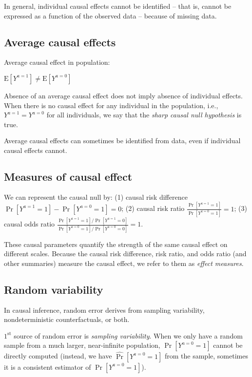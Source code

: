 \documentclass{article}
\begin{document}
In general, individual causal effects cannot be identified -- that is, cannot be expressed as a function of the observed data -- because of missing data. 

\subsection{Average causal effects}
\begin{mdframed}
Average causal effect in population:
\begin{center}
	$\mathrm{E}\left[Y^{a=1}\right] \neq \mathrm{E}\left[Y^{a=0}\right]$
\end{center}
\end{mdframed}

Absence of an average causal effect does not imply absence of individual effects. When there is no causal effect for any individual in the population, i.e., $Y^{a=1}=Y^{a=0}$ for all individuals, we say that the \textit{sharp causal null hypothesis} is true.  

Average causal effects can sometimes be identified from data, even if individual causal effects cannot.

\subsection{Measures of causal effect}
We can represent the causal null by: (1)  causal risk difference  $\operatorname{Pr}\left[Y^{a=1}=1\right]-\operatorname{Pr}\left[Y^{a=0}=1\right]=0$; (2) causal risk ratio  $\frac{\operatorname{Pr}\left[Y^{a=1}=1\right]}{\operatorname{Pr}\left[Y^{a=0}=1\right]}=1$; (3) causal odds ratio $\frac{\operatorname{Pr}\left[Y^{a=1}=1\right] / \operatorname{Pr}\left[Y^{a=1}=0\right]}{\operatorname{Pr}\left[Y^{a=0}=1\right] / \operatorname{Pr}\left[Y^{a=0}=0\right]}=1$.

These causal parameters quantify the strength of the same causal effect on different scales. Because the causal risk difference, risk ratio, and odds ratio (and other summaries) measure the causal effect, we refer to them as \textit{effect measures}.

\subsection{Random variability}
In causal inference, random error derives from sampling variability, nondeterministic counterfactuals, or both. 

$1^{\mathrm{st}}$ source of random error is \textit{sampling variability}. When we only have a random sample from a much larger, near-infinite population, $\operatorname{Pr}\left[Y^{a=0}=1\right]$ cannot be directly computed (instead, we have $\widehat{\operatorname{Pr}}\left[Y^{a=0}=1\right]$ from the sample, sometimes it is a consistent estimator of $\operatorname{Pr}\left[Y^{a=0}=1\right]$). 
\end{document}

